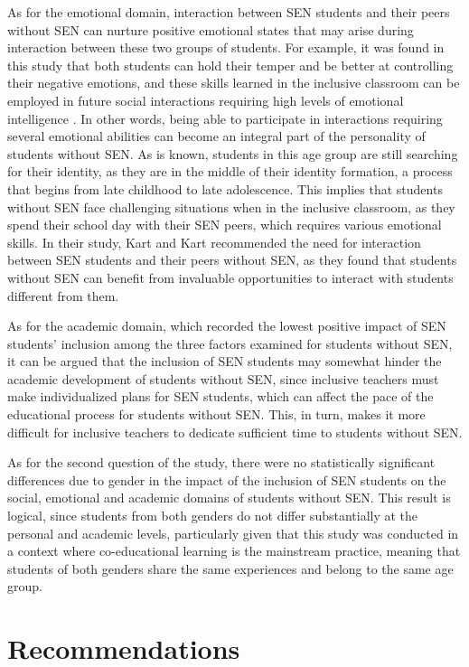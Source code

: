 \documentclass[10pt]{NSP1}
\begin{document}
	As for the emotional domain, interaction between SEN students and their peers without SEN can nurture positive emotional states that may arise during interaction between these two groups of students. For example, it was found in this study that both students can hold their temper and be better at controlling their negative emotions, and these skills learned in the inclusive classroom can be employed in future social interactions requiring high levels of emotional intelligence \cite{ref27}. In other words, being able to participate in interactions requiring several emotional abilities can become an integral part of the personality of students without SEN. As is known, students in this age group are still searching for their identity, as they are in the middle of their identity formation, a process that begins from late childhood to late adolescence. This implies that students without SEN face challenging situations when in the inclusive classroom, as they spend their school day with their SEN peers, which requires various emotional skills. In their study, Kart and Kart \cite{ref26} recommended the need for interaction between SEN students and their peers without SEN, as they found that students without SEN can benefit from invaluable opportunities to interact with students different from them.

	As for the academic domain, which recorded the lowest positive impact of SEN students' inclusion among the three factors examined for students without SEN, it can be argued that the inclusion of SEN students may somewhat hinder the academic development of students without SEN, since inclusive teachers must make individualized plans for SEN students, which can affect the pace of the educational process for students without SEN. This, in turn, makes it more difficult for inclusive teachers to dedicate sufficient time to students without SEN.

	As for the second question of the study, there were no statistically significant differences due to gender in the impact of the inclusion of SEN students on the social, emotional and academic domains of students without SEN. This result is logical, since students from both genders do not differ substantially at the personal and academic levels, particularly given that this study was conducted in a context where co-educational learning is the mainstream practice, meaning that students of both genders share the same experiences and belong to the same age group.

	\section{Recommendations}
\end{document}

